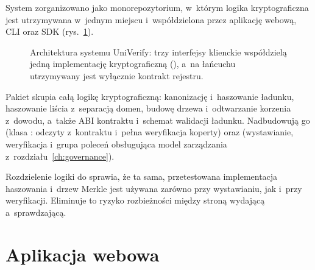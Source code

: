 System zorganizowano jako monorepozytorium, w~którym logika kryptograficzna jest
utrzymywana w~jednym miejscu i~współdzielona przez aplikację webową, CLI oraz SDK
(rys.~\ref{fig:architektura}).

\begin{figure}[H]
\centering
{}
\caption[Architektura systemu UniVerify]{Architektura systemu UniVerify: trzy interfejsy klienckie współdzielą
jedną implementację kryptograficzną (), a~na łańcuchu
utrzymywany jest wyłącznie kontrakt rejestru.}
\label{fig:architektura}
\end{figure}

Pakiet  skupia całą logikę kryptograficzną: kanonizację
i~haszowanie ładunku, haszowanie liścia z~separacją domen, budowę drzewa
i~odtwarzanie korzenia z~dowodu, a~także ABI kontraktu i~schemat walidacji
ładunku. Nadbudowują go  (klasa : odczyty
z~kontraktu i~pełna weryfikacja koperty) oraz  (wystawianie,
weryfikacja i~grupa poleceń  obsługująca model zarządzania
z~rozdziału~\ref{ch:governance}).

Rozdzielenie logiki do  sprawia, że ta sama, przetestowana
implementacja haszowania i~drzew Merkle jest używana zarówno przy wystawianiu, jak
i~przy weryfikacji. Eliminuje to ryzyko rozbieżności między stroną wydającą
a~sprawdzającą.

\section{Aplikacja webowa}
\label{sec:web}

